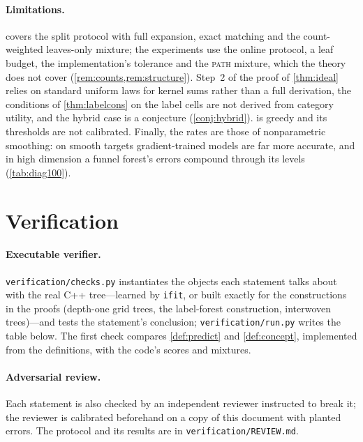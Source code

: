 \documentclass[11pt]{article}
\theoremstyle{definition}
\theoremstyle{remark}
\begin{document}
\paragraph{Limitations.}
 covers the split protocol with full expansion, exact matching and the
count-weighted leaves-only mixture; the experiments use the online protocol, a leaf
budget, the implementation's tolerance and the \textsc{path} mixture, which the theory
does not cover (\cref{rem:counts,rem:structure}).  Step~2 of the proof of
\cref{thm:ideal} relies on standard uniform laws for kernel sums rather than a full
derivation, the conditions of \cref{thm:labelcons} on the label cells are not derived
from category utility, and the hybrid case is a conjecture (\cref{conj:hybrid}).
 is greedy and its thresholds are not calibrated.  Finally, the
rates are those of nonparametric smoothing: on smooth targets gradient-trained models
are far more accurate, and in high dimension a funnel forest's errors compound through
its levels (\cref{tab:diag100}).

\appendix
\section{Verification}\label{app:verify}

\paragraph{Executable verifier.}
\texttt{verification/checks.py} instantiates the objects each statement talks about with
the real C++ tree---learned by \texttt{ifit}, or built exactly for the constructions in
the proofs (depth-one grid trees, the label-forest construction, interwoven trees)---and
tests the statement's conclusion; \texttt{verification/run.py} writes the table below.
The first check compares \cref{def:predict} and \cref{def:concept}, implemented from the
definitions, with the code's scores and mixtures.


\paragraph{Adversarial review.}
Each statement is also checked by an independent reviewer instructed to break it; the
reviewer is calibrated beforehand on a copy of this document with planted errors.  The
protocol and its results are in \texttt{verification/REVIEW.md}.



\end{document}
